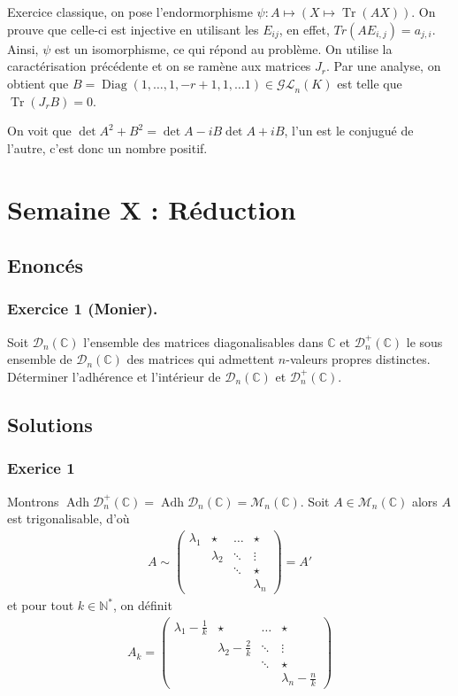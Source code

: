 \documentclass{article}
\DeclareMathOperator{\Tr}{Tr}
\DeclareMathOperator{\diag}{Diag}
\DeclareMathOperator{\adh}{Adh}
\begin{document}
	Exercice classique, on pose l'endormorphisme $\psi : A \mapsto (X\mapsto \Tr(AX))$. On prouve que celle-ci est injective en utilisant les $E_{ij}$, en effet, $Tr(AE_{i,j}) = a_{j,i}$. Ainsi, $\psi$ est un isomorphisme, ce qui répond au problème. On utilise la caractérisation précédente et on se ramène aux matrices $J_r$. Par une analyse, on obtient que $B = \diag(1, \ldots, 1, -r+1, 1, \ldots 1)\in\mathcal{GL}_n(K)$ est telle que $\Tr(J_rB) = 0$. 

	On voit que $\det A^2 + B^2 = \det A-iB \det A+iB$, l'un est le conjugué de l'autre, c'est donc un nombre positif.
	\section{Semaine X : Réduction}
	\subsection*{Enoncés}
	\subsubsection*{Exercice 1 (Monier).}
	Soit $\mathcal{D}_n(\mathbb{C})$ l'ensemble des matrices diagonalisables dans $\mathbb{C}$ et $\mathcal{D}_n^+(\mathbb{C})$ le sous ensemble de $\mathcal{D}_n(\mathbb{C})$ des matrices qui admettent $n$-valeurs propres distinctes. Déterminer l'adhérence et l'intérieur de $\mathcal{D}_n(\mathbb{C})$ et $\mathcal{D}_n^+(\mathbb{C})$.
	\subsection*{Solutions}
	\subsubsection*{Exerice 1}
	Montrons $\adh \mathcal{D}_n^+(\mathbb{C}) = \adh \mathcal{D}_n(\mathbb{C}) = \mathcal{M}_n(\mathbb{C})$. Soit $A\in\mathcal{M}_n(\mathbb{C})$ alors $A$ est trigonalisable, d'où 
	\begin{align*}
		A \sim \begin{pmatrix}   
  \lambda_1 & \star & \ldots & \star\\
	    & \lambda_2 & \ddots&\vdots\\
	    &&\ddots & \star \\
	    & & & \lambda_n
		\end{pmatrix} = A'
	\end{align*}
	et pour tout $k\in \mathbb{N}^*$, on définit 
	\begin{align*}
		A_k = \begin{pmatrix}
			\lambda_1-\frac{1}{k} & \star & \ldots & \star\\
					      & \lambda_2-\frac{2}{k} & \ddots & \vdots\\
					      &&\ddots & \star \\
					      & & & \lambda_n-\frac{n}{k}
		\end{pmatrix}
	\end{align*}
\end{document}
